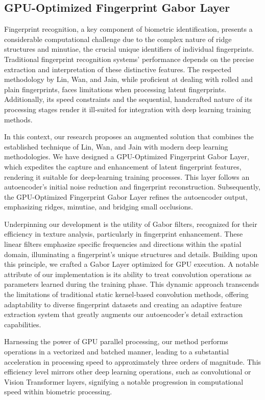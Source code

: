 \documentclass[twocolumn, switch]{article} %
\begin{document}
\subsection{GPU-Optimized Fingerprint Gabor Layer}
\label{gpuoptmizedgaborlayer}

Fingerprint recognition, a key component of biometric identification, presents a considerable computational challenge due to the complex nature of ridge structures and minutiae, the crucial unique identifiers of individual fingerprints. Traditional fingerprint recognition systems' performance depends on the precise extraction and interpretation of these distinctive features. The respected methodology by Lin, Wan, and Jain, while proficient at dealing with rolled and plain fingerprints, faces limitations when processing latent fingerprints. Additionally, its speed constraints and the sequential, handcrafted nature of its processing stages render it ill-suited for integration with deep learning training methods.

In this context, our research proposes an augmented solution that combines the established technique of Lin, Wan, and Jain with modern deep learning methodologies. We have designed a GPU-Optimized Fingerprint Gabor Layer, which expedites the capture and enhancement of latent fingerprint features, rendering it suitable for deep-learning training processes. This layer follows an autoencoder's initial noise reduction and fingerprint reconstruction. Subsequently, the GPU-Optimized Fingerprint Gabor Layer refines the autoencoder output, emphasizing ridges, minutiae, and bridging small occlusions.

Underpinning our development is the utility of Gabor filters, recognized for their efficiency in texture analysis, particularly in fingerprint enhancement. These linear filters emphasize specific frequencies and directions within the spatial domain, illuminating a fingerprint's unique structures and details. Building upon this principle, we crafted a Gabor Layer optimized for GPU execution. A notable attribute of our implementation is its ability to treat convolution operations as parameters learned during the training phase. This dynamic approach transcends the limitations of traditional static kernel-based convolution methods, offering adaptability to diverse fingerprint datasets and creating an adaptive feature extraction system that greatly augments our autoencoder's detail extraction capabilities.

Harnessing the power of GPU parallel processing, our method performs operations in a vectorized and batched manner, leading to a substantial acceleration in processing speed to approximately three orders of magnitude. This efficiency level mirrors other deep learning operations, such as convolutional or Vision Transformer layers, signifying a notable progression in computational speed within biometric processing.
\end{document}
